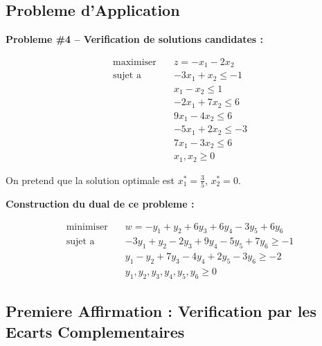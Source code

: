 \documentclass[12pt,a4paper]{article}
\begin{document}
\subsection{Probleme d'Application}

\begin{exemple}
\textbf{Probleme \#4 -- Verification de solutions candidates :}

\begin{align*}
\text{maximiser} \quad & z = -x_1 - 2x_2\\
\text{sujet a} \quad & -3x_1 + x_2 \leq -1\\
& x_1 - x_2 \leq 1\\
& -2x_1 + 7x_2 \leq 6\\
& 9x_1 - 4x_2 \leq 6\\
& -5x_1 + 2x_2 \leq -3\\
& 7x_1 - 3x_2 \leq 6\\
& x_1, x_2 \geq 0
\end{align*}

On pretend que la solution optimale est $x_1^* = \frac{3}{5}$, $x_2^* = 0$.
\end{exemple}

\begin{methode}
\textbf{Construction du dual de ce probleme :}

\begin{align*}
\text{minimiser} \quad & w = -y_1 + y_2 + 6y_3 + 6y_4 - 3y_5 + 6y_6\\
\text{sujet a} \quad & -3y_1 + y_2 - 2y_3 + 9y_4 - 5y_5 + 7y_6 \geq -1\\
& y_1 - y_2 + 7y_3 - 4y_4 + 2y_5 - 3y_6 \geq -2\\
& y_1, y_2, y_3, y_4, y_5, y_6 \geq 0
\end{align*}
\end{methode}

\newpage
\subsection{Premiere Affirmation : Verification par les Ecarts Complementaires}
\end{document}
